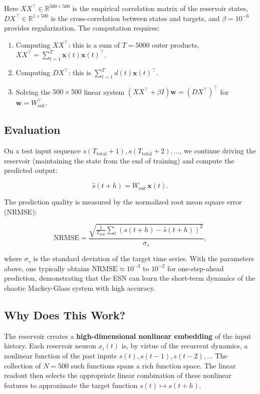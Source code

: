 Here $X X^\top \in \mathbb{R}^{500 \times 500}$ is the empirical correlation matrix of the reservoir states, $D X^\top \in \mathbb{R}^{1 \times 500}$ is the cross-correlation between states and targets, and $\beta = 10^{-6}$ provides regularization. The computation requires:

\begin{enumerate}[nosep]
  \item Computing $XX^\top$: this is a sum of $T = 5000$ outer products, $XX^\top = \sum_{t=1}^{T} \mathbf{x}(t) \mathbf{x}(t)^\top$.
  \item Computing $DX^\top$: this is $\sum_{t=1}^{T} d(t) \mathbf{x}(t)^\top$.
  \item Solving the $500 \times 500$ linear system $(XX^\top + \beta I) \mathbf{w} = (DX^\top)^\top$ for $\mathbf{w} = W_{\text{out}}^\top$.
\end{enumerate}

\subsection{Evaluation}\label{sec:14.6.6}

On a test input sequence $s(T_{\text{total}}+1), s(T_{\text{total}}+2), \ldots$, we continue driving the reservoir (maintaining the state from the end of training) and compute the predicted output:

\[
\hat{s}(t+h) = W_{\text{out}} \, \mathbf{x}(t).
\]

The prediction quality is measured by the normalized root mean square error (NRMSE):

\[
\text{NRMSE} = \frac{\sqrt{\frac{1}{T_{\text{test}}} \sum_{t} (s(t+h) - \hat{s}(t+h))^2}}{\sigma_s},
\]

where $\sigma_s$ is the standard deviation of the target time series. With the parameters above, one typically obtains $\text{NRMSE} \approx 10^{-3}$ to $10^{-2}$ for one-step-ahead prediction, demonstrating that the ESN can learn the short-term dynamics of the chaotic Mackey-Glass system with high accuracy.

\subsection{Why Does This Work?}\label{sec:14.6.7}

The reservoir creates a \textbf{high-dimensional nonlinear embedding} of the input history. Each reservoir neuron $x_i(t)$ is, by virtue of the recurrent dynamics, a nonlinear function of the past inputs $s(t), s(t-1), s(t-2), \ldots$ The collection of $N = 500$ such functions spans a rich function space. The linear readout then selects the appropriate linear combination of these nonlinear features to approximate the target function $s(t) \mapsto s(t+h)$.

